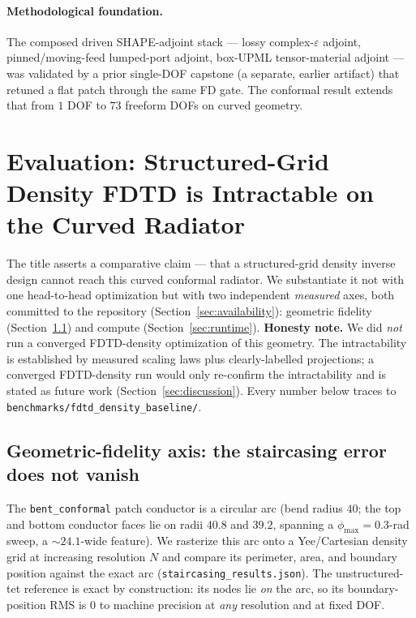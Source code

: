 \documentclass{anvil-paper}
\begin{document}
\paragraph{Methodological foundation.}
The composed driven SHAPE-adjoint stack --- lossy complex-$\varepsilon$ adjoint,
pinned/moving-feed lumped-port adjoint, box-UPML tensor-material adjoint --- was
validated by a prior single-DOF capstone (a separate, earlier artifact) that
retuned a flat patch through the same FD gate. The conformal result extends that
from $1$ DOF to $73$ freeform DOFs on curved geometry.

\section{Evaluation: Structured-Grid Density FDTD is Intractable on the Curved Radiator}
\label{sec:eval}

The title asserts a comparative claim --- that a structured-grid density inverse
design cannot reach this curved conformal radiator. We substantiate it not with
one head-to-head optimization but with two independent \emph{measured} axes,
both committed to the repository (Section~\ref{sec:availability}): geometric
fidelity (Section~\ref{sec:staircase}) and compute (Section~\ref{sec:runtime}).
\textbf{Honesty note.} We did \emph{not} run a converged FDTD-density
optimization of this geometry. The intractability is established by measured
scaling laws plus clearly-labelled projections; a converged FDTD-density run
would only re-confirm the intractability and is stated as future work
(Section~\ref{sec:discussion}). Every number below traces to
\texttt{benchmarks/fdtd\_density\_baseline/}.

\subsection{Geometric-fidelity axis: the staircasing error does not vanish}
\label{sec:staircase}

The \texttt{bent\_conformal} patch conductor is a circular arc (bend radius $40$;
the top and bottom conductor faces lie on radii $40.8$ and $39.2$, spanning a
$\phi_{\max}=0.3$-rad sweep, a $\sim\!24.1$-wide feature). We rasterize this arc
onto a Yee/Cartesian density grid at increasing resolution $N$ and compare its
perimeter, area, and boundary position against the exact arc
(\texttt{staircasing\_results.json}). The unstructured-tet reference is exact by
construction: its nodes lie \emph{on} the arc, so its boundary-position RMS is
$0$ to machine precision at \emph{any} resolution and at fixed DOF.
\end{document}

